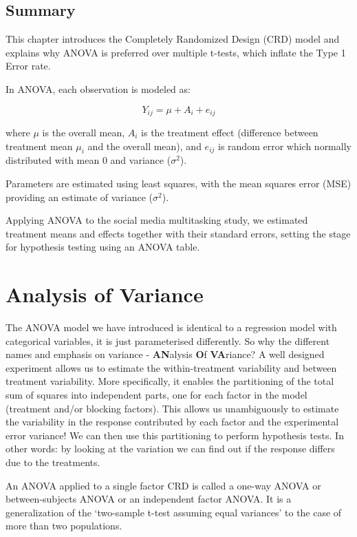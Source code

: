 \documentclass[
  letterpaper,
]{book}
\begin{document}
\section{Summary}\label{summary-1}

This chapter introduces the Completely Randomized Design (CRD) model and
explains why ANOVA is preferred over multiple t-tests, which inflate the
Type 1 Error rate.

In ANOVA, each observation is modeled as:

\[
Y_{ij} = \mu + A_{i} + e_{ij}
\]

where \(\mu\) is the overall mean, \(A_{i}\) is the treatment effect
(difference between treatment mean \(\mu_i\) and the overall mean), and
\(e_{ij}\) is random error which normally distributed with mean 0 and
variance (\(\sigma^2\)).

Parameters are estimated using least squares, with the mean squares
error (MSE) providing an estimate of variance (\(\sigma^2\)).

Applying ANOVA to the social media multitasking study, we estimated
treatment means and effects together with their standard errors, setting
the stage for hypothesis testing using an ANOVA table.

\chapter{Analysis of Variance}\label{analysis-of-variance}

The ANOVA model we have introduced is identical to a regression model
with categorical variables, it is just parameterised differently. So why
the different names and emphasis on variance - \textbf{AN}alysis
\textbf{O}f \textbf{VA}riance? A well designed experiment allows us to
estimate the within-treatment variability and between treatment
variability. More specifically, it enables the partitioning of the total
sum of squares into independent parts, one for each factor in the model
(treatment and/or blocking factors). This allows us unambiguously to
estimate the variability in the response contributed by each factor and
the experimental error variance! We can then use this partitioning to
perform hypothesis tests. In other words: by looking at the variation we
can find out if the response differs due to the treatments.

An ANOVA applied to a single factor CRD is called a one-way ANOVA or
between-subjects ANOVA or an independent factor ANOVA. It is a
generalization of the `two-sample t-test assuming equal variances' to
the case of more than two populations.
\end{document}
